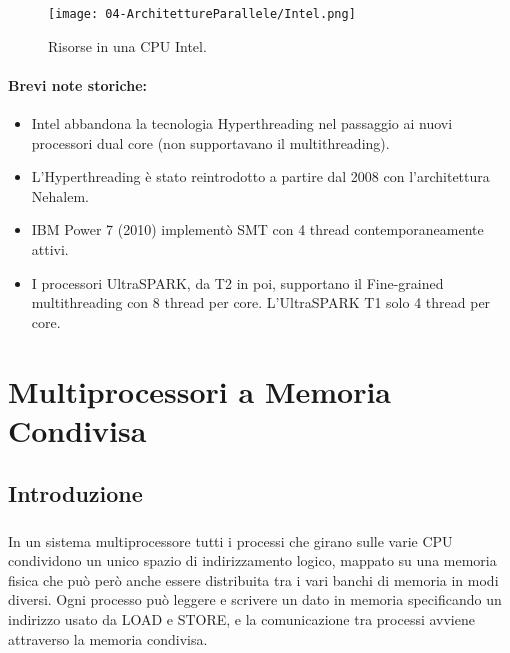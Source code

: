 \begin{figure}[h]
    \centering
    \texttt{[image: 04-ArchitettureParallele/Intel.png]}
    \caption{Risorse in una CPU Intel.}
\end{figure}

\paragraph{Brevi note storiche:}

\begin{itemize}
  \item Intel abbandona la tecnologia Hyperthreading nel passaggio ai nuovi processori dual core (non supportavano il multithreading). 
  \item L'Hyperthreading è stato reintrodotto a partire dal 2008 con l'architettura Nehalem. 
  \item IBM Power 7 (2010) implementò SMT con 4 thread contemporaneamente attivi. 
  \item I processori UltraSPARK, da T2 in poi, supportano il Fine-grained multithreading con 8 thread per core. L'UltraSPARK T1 solo 4 thread per core.
\end{itemize}

\section{Multiprocessori a Memoria Condivisa}

\subsection{Introduzione}

 \subsubsection{}
 In un sistema multiprocessore tutti i processi che girano sulle varie CPU condividono un unico spazio di indirizzamento logico, mappato su una memoria fisica che può però anche essere distribuita tra i vari banchi di memoria in modi diversi. Ogni processo può leggere e scrivere un dato in memoria specificando un indirizzo usato da LOAD e STORE, e la comunicazione tra processi avviene attraverso la memoria condivisa.




